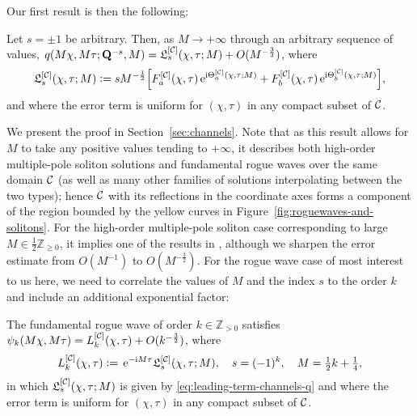 Our first result is then the following:  
\begin{theorem}
Let $s=\pm 1$ be arbitrary.  Then, as $M\to+\infty$ through an arbitrary sequence of values,
$q(M\chi,M\tau;\mathbf{Q}^{-s},M)=\mathfrak{L}_s^{[\mathcal{C}]}(\chi,\tau;M)+O(M^{-\frac{3}{2}})$, where
\begin{equation}
\mathfrak{L}_s^{[\channels]}(\chi,\tau;M)\defeq sM^{-\frac{1}{2}}\left[F_a^{[\channels]}(\chi,\tau)\ee^{\ii\Theta_a^{[\channels]}(\chi,\tau;M)} + F_b^{[\channels]}(\chi,\tau)\ee^{\ii\Theta_b^{[\channels]}(\chi,\tau;M)}\right],
\label{eq:leading-term-channels-q}
\end{equation}
and where the error term is uniform for $(\chi,\tau)$ in any compact subset of $\mathcal{C}$.
\label{thm:channels}
\end{theorem}
We present the proof in Section~\ref{sec:channels}.  Note that as this result allows for $M$ to take any positive values tending to $+\infty$, it describes both high-order multiple-pole soliton solutions and fundamental rogue waves over the same domain $\mathcal{C}$ (as well as many other families of solutions interpolating between the two types); hence $\mathcal{C}$ with its reflections in the coordinate axes forms a component of the region bounded by the yellow curves in Figure~\ref{fig:roguewaves-and-solitons}.   For the high-order multiple-pole soliton case corresponding to large $M\in\tfrac{1}{2}\mathbb{Z}_{\ge 0}$, it implies one of the results in \cite{BilmanBW19}, although we sharpen the error estimate from $O(M^{-1})$ to $O(M^{-\frac{3}{2}})$.  For the rogue wave case of most interest to us here, we need to correlate the values of $M$ and the index $s$ to the order $k$ and include an additional exponential factor:
\begin{corollary}
The fundamental rogue wave of order $k\in\mathbb{Z}_{>0}$ satisfies $\psi_k(M\chi,M\tau)=L_k^{[\mathcal{C}]}(\chi,\tau)+O(k^{-\frac{3}{2}})$, where
\begin{equation}
L_k^{[\mathcal{C}]}(\chi,\tau)\vcentcolon= 
\,\mathrm{e}^{-\mathrm{i} M\tau}\mathfrak{L}_s^{[\mathcal{C}]}(\chi,\tau;M),
\quad s=(-1)^k,\quad M=\tfrac{1}{2}k+\tfrac{1}{4},
\label{eq:leading-term-channels}
\end{equation}
in which $\mathfrak{L}_s^{[\mathcal{C}]}(\chi,\tau;M)$ is given by \eqref{eq:leading-term-channels-q} 
and where the error term is uniform for $(\chi,\tau)$ in any compact subset of $\mathcal{C}$.
\label{cor:rogue-wave-channels}
\end{corollary}
